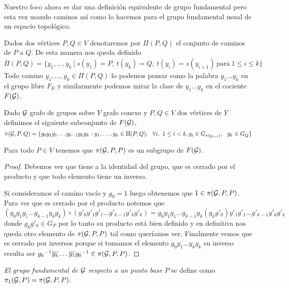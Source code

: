 \documentclass[tesis.tex]{subfiles}
\begin{document}
Nuestro foco ahora es dar una definición equivalente de grupo fundamental pero esta vez usando caminos así como lo hacemos para el grupo fundamental usual de un espacio topológico.

\medskip
Dados dos vértices $P,Q \in V$ denotaremos por $\Pi(P,Q)$ el conjunto de caminos de $P$ a $Q$.
De esta manera nos queda definido
\[
\Pi(P,Q) = \{  y_1, \dots, y_k \ | \ s(y_1)=P, \ t(y_k) = Q, \ t(y_i) = s(y_{i+1})  \ \text{para} \ 1 \le i \le k \}
\]
Todo camino $y_1, \dots, y_k \in \Pi(P,Q)$ lo podemos pensar como la palabra $y_1 \dots y_k$ en el grupo libre $F_E$ y similarmente podemos mirar la clase de $y_1\dots y_k$ en el cociente $F({\cal G})$.  

\begin{deff}
	Dado ${\cal G}$ grafo de grupos sobre $Y$ grafo conexo y $P,Q \in V$ dos vértices de $Y$ definimos el siguiente subconjunto de $F({\cal G})$,
	\begin{equation*}
		\pi(\cG, P, Q) = \{  g_0y_1g_1 \dots g_{k-1}y_kg_k : y_1,\dots, y_k \in \Pi(P,Q), \ \ 
		 \forall i, \ 1 \le i < k, g_i \in G_{s(y_{i+1})}, \ \ g_k \in G_Q \}	
	\end{equation*}
\end{deff}
 
\begin{prop}
	Para todo $P \in V$ tenemos que $\pi({\cal G},P,P)$ es un subgrupo de $F({\cal G})$.
\end{prop}
\begin{proof}
	Debemos ver que tiene a la identidad del grupo, que es cerrado por el producto y que todo elemento tiene un inverso.

	Si consideramos el camino vacío y $g_0 = 1$ luego obtenemos que $1 \in \pi({\cal G}, P , P)$.
	Para ver que es cerrado por el producto notemos que 
	\begin{equation*}
		(g_0y_1g_1 \dots g_{k-1}y_kg_k ) \circ ( g'_0y'_1g'_1 \dots g'_{k-1}y'_kg'_k) =  g_0y_1g_1 \dots g_{k-1}y_k(g_kg'_0)y'_1g'_1 \dots g'_{k-1}y'_kg'_k
	\end{equation*}
	donde $g_kg'_0 \in G_P$ por lo tanto su producto está bien definido y en definitiva nos queda otro elemento de $\pi({\cal G}, P, P)$ tal como queríamos ver.
	Finalmente vemos que es cerrado por inversos porque si tomamos el elemento $g_0y_1\dots y_{k} g_k$ su inverso resulta ser ${g_k}^{-1} \overline{y_k} \dots \overline{y_1}{g_0}^{-1} \in \pi({\cal G},P,P)$.
\end{proof}

\begin{deff}
	\emph{El grupo fundamental de ${\cal G}$ respecto a un punto base $P$} se define como $\pi_1({\cal G}, P) = \pi({\cal G},P,P)$.
\end{deff}
\end{document}
